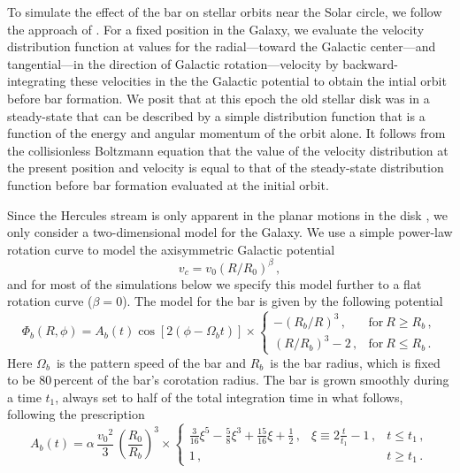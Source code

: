 \documentclass[12pt,preprint]{aastex}
\newcommand{\eg}{e.g.}
\newcommand{\vo}{\ensuremath{v_0}}
\newcommand{\Ro}{\ensuremath{R_0}}
\newcommand{\Ab}{\ensuremath{A_b}}
\newcommand{\Rb}{\ensuremath{R_b}}
\newcommand{\Omegab}{\ensuremath{\Omega_b}}
\begin{document}
To simulate the effect of the bar on stellar orbits near the Solar
circle, we follow the approach of \citet{dehnen00a}. For a fixed
position in the Galaxy, we evaluate the velocity distribution function
at values for the radial---toward the Galactic center---and
tangential---in the direction of Galactic rotation---velocity by
backward-integrating these velocities in the the Galactic potential to
obtain the intial orbit before bar formation. We posit that at this
epoch the old stellar disk was in a steady-state that can be described
by a simple distribution function that is a function of the energy and
angular momentum of the orbit alone. It follows from the collisionless
Boltzmann equation that the value of the velocity distribution at the
present position and velocity is equal to that of the steady-state
distribution function before bar formation evaluated at the initial
orbit.

Since the Hercules stream is only apparent in the planar motions in
the disk \citep[\eg,][]{Bovy09a}, we only consider a two-dimensional
model for the Galaxy. We use a simple power-law rotation curve to
model the axisymmetric Galactic potential
\begin{equation}
v_c = \vo(R/\Ro)^\beta \,,
\end{equation}
and for most of the simulations below we specify this model further to
a flat rotation curve ($\beta = 0$). The model for the bar is given by
the following potential
\begin{equation}
\Phi_b(R,\phi) = \Ab(t) \cos [2(\phi - \Omegab t)] \times
\left\{ \begin{array}{ll} -(\Rb/R)^3\,, & \mathrm{for}\ R \geq
  \Rb\,,\\ (R/\Rb)^3-2\,, & \mathrm{for}\ R \leq \Rb\,. \end{array}
\right.
\end{equation}
Here \Omegab\ is the pattern speed of the bar and \Rb\ is the bar
radius, which is fixed to be 80\,percent of the bar's corotation
radius. The bar is grown smoothly during a time $t_1$, always set to
half of the total integration time in what follows, following the
prescription
\begin{equation}
\Ab(t) = \alpha \, \frac{\vo^2}{3}\,\left(\frac{\Ro}{\Rb}\right)^3
\times \left\{ \begin{array}{lll}
\frac{3}{16}\xi^5 - \frac{5}{8} \xi^3 + \frac{15}{16} \xi + \frac{1}{2}\,, & \xi \equiv 2\frac{t}{t_1}-1\,, & t \leq t_1\,,\\
1\,, & & t \geq t_1\,.\end{array} \right. 
\end{equation}
\end{document}
